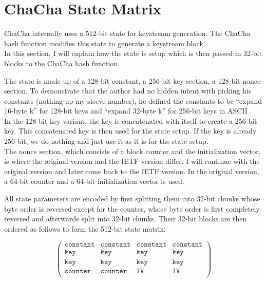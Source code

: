 \section{ChaCha State Matrix}
\label{sec:chacha.matrix}

ChaCha internally uses a 512-bit state for keystream generation. The ChaCha hash function modifies this state to generate a keystream block. \\
In this section, I will explain how the state is setup which is then passed in 32-bit blocks to the ChaCha hash function.

The state is made up of a 128-bit constant, a 256-bit key section, a 128-bit nonce section. To demonstrate that the author had no hidden intent with picking his constants (nothing-up-my-sleeve number), he defined the constants to be ``expand 16-byte k'' for 128-bit keys and ``expand 32-byte k'' for 256-bit keys in ASCII .\\
In the 128-bit key variant, the key is concatenated with itself to create a 256-bit key. This concatenated key is then used for the state setup. If the key is already 256-bit, we do nothing and just use it as it is for the state setup.\\
The nonce section, which consists of a block counter and the initialization vector, is where the original version and the IETF version differ. I will continue with the original version and later come back to the IETF version. In the original version, a 64-bit counter and a 64-bit initialization vector is used.

All state parameters are encoded by first splitting them into 32-bit chunks whose byte order is reversed except for the counter, whose byte order is first completely reversed and afterwards split into 32-bit chunks. Their 32-bit blocks are then ordered as follows to form the 512-bit state matrix:

\begin{equation*}
\begin{pmatrix}
\texttt{constant}& \texttt{constant} & \texttt{constant} & \texttt{constant} \\
\texttt{key} & \texttt{key} & \texttt{key} & \texttt{key} \\
\texttt{key} & \texttt{key} & \texttt{key} & \texttt{key} \\
\texttt{counter} & \texttt{counter} & \texttt{IV} & \texttt{IV} \\
\end{pmatrix}
\end{equation*}


